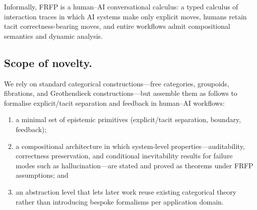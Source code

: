 \documentclass[preprints,accept]{Definitions/mdpi}
\theoremstyle{definition}
\begin{document}
\smallskip
\noindent
Informally, FRFP is a human--AI conversational calculus: a typed calculus of interaction traces in which AI systems make only explicit moves, humans retain tacit correctness-bearing moves, and entire workflows admit compositional semantics and dynamic analysis.

\subsection{Scope of novelty.}
We rely on standard categorical constructions---free categories, groupoids, fibrations, and Grothendieck constructions---but assemble them as follows to formalise explicit/tacit separation and feedback in human--AI workflows:
\begin{enumerate}
  \item a minimal set of epistemic primitives (explicit/tacit separation, boundary, feedback);
  \item a compositional architecture in which system-level properties---auditability, correctness preservation, and conditional inevitability results for failure modes such as hallucination---are stated and proved as theorems under FRFP assumptions; and
  \item an abstraction level that lets later work reuse existing categorical theory rather than introducing bespoke formalisms per application domain.
\end{enumerate}
\end{document}
